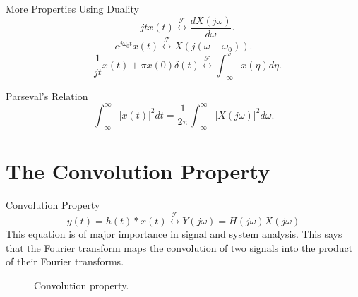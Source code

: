 \begin{frame}{More Properties Using Duality}
    \begin{equation*}
        -jtx(t) \overset{\mathcal{F}}{\longleftrightarrow} \frac{dX(j\omega)}{d\omega}.
    \end{equation*}
    \begin{equation*}
        e^{j\omega_0 t}x(t) \overset{\mathcal{F}}{\longleftrightarrow} X(j(\omega - \omega_0)).
    \end{equation*}
    \begin{equation*}
        -\frac{1}{jt}x(t) + \pi x(0) \delta(t) \overset{\mathcal{F}}{\longleftrightarrow} \int_{-\infty}^{\omega}x(\eta)d\eta.
    \end{equation*}
\end{frame}

\begin{frame}{Parseval's Relation}
    \begin{equation*}
        \int_{-\infty}^{\infty} |x(t)|^2dt = \frac{1}{2\pi} \int_{-\infty}^{\infty} |X(j\omega)|^2d\omega.
    \end{equation*}

\end{frame}


\section{The Convolution Property}

\begin{frame}{Convolution Property}
    \begin{equation*}
        y(t) = h(t)\ast x(t) \overset{\mathcal{F}}{\longleftrightarrow} Y(j\omega) =  H(j\omega)  X(j\omega)
    \end{equation*}
    This equation is of major importance in signal and system analysis. This says that the Fourier transform maps the convolution of two signals into the product of their Fourier transforms.
\end{frame}



\begin{frame}
    \begin{figure}
      \centering
      
      \caption{Convolution property.}\label{fi:conv_prop}
    \end{figure}

\end{frame}


